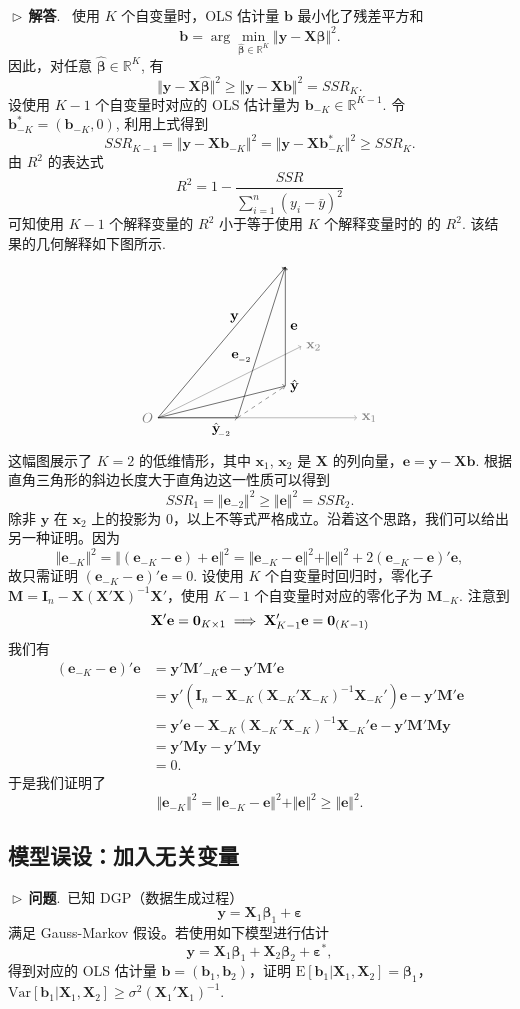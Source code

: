 \documentclass{article}
\newcommand{\E}{\mathrm{E}}
\newcommand{\Var}{\mathrm{Var}}
\newcommand{\y}{\mathbf{y}}
\newcommand{\X}{\mathbf{X}}
\newcommand{\M}{\mathbf{M}}
\newcommand{\e}{\mathbf{e}}
\newcommand{\0}{\mathbf{0}}
\newcommand{\vbe}{\bm{\beta}}
\newcommand{\ve}{\bm{\varepsilon}}
\newcommand{\vb}{\mathbf{b}}
\newcommand{\pro}{\noindent$\vartriangleright\,$\textbf{问题}.\ }
\newcommand{\sol}{\noindent$\vartriangleright\,$\textbf{解答}.\ }
\begin{document}
\sol
使用 $K$ 个自变量时，OLS 估计量 $\vb$ 最小化了残差平方和
\[
\vb=\arg\min_{\hat{\vbe}\in\mathbb{R}^K}\Vert\y-\X\hat{\vbe}\Vert^2.
\]
因此，对任意 $\hat{\vbe}\in\mathbb{R}^K$, 有
\[
\Vert\y-\X\hat{\vbe}\Vert^2\ge\Vert\y-\X\vb\Vert^2=SSR_K.
\]
设使用 $K-1$ 个自变量时对应的 OLS 估计量为 $\vb_{-K}\in\mathbb{R}^{K-1}$. 令 $\vb_{-K}^*=(\vb_{-K},0)$, 利用上式得到
\[
SSR_{K-1}=\Vert\y-\X\vb_{-K}\Vert^2=\Vert\y-\X\vb_{-K}^*\Vert^2\ge SSR_K.
\]
由 $R^2$ 的表达式
\[
R^2=1-\frac{SSR}{\sum\limits_{i=1}^n(y_i-\bar{y})^2}
\]    
可知使用 $K-1$ 个解释变量的 $R^2$ 小于等于使用 $K$ 个解释变量时的 的 $R^2$. 该结果的几何解释如下图所示.
\[
\begin{tikzpicture}
\draw [color=black!50,->](0,0) node[left]{$O$}-- node [color=black!20,pos=0.25,above,sloped]{}(3.6,1.8) node[right]{$\mathbf{x}_2$};
\draw [color=black!50,->](0,0) node[left]{}-- node [color=black!20,pos=0.25,above,sloped]{}(5,0) node[right]{$\mathbf{x}_1$};
\draw [color=black,->](0,0) node[left]{}-- node [color=black,pos=0.6,above]{$\y$}(3.2,3.8) node[right]{};
\draw [color=black,->](3.2,0.8) node[left]{}-- node [color=black,pos=0.5,right]{$\e$}(3.2,3.8) node[right]{};
\draw [color=black,->](0,0) node[left]{}-- node [color=red!70,pos=0.25,above,sloped]{}(3.2,0.8) node[right]{$\hat{\y}$};
\draw [color=black,->](2,0) node[left]{}-- node [color=black,pos=0.4,left]{$\e_{\hspace{-0.5pt}_{-2}}$}(3.2,3.8) node[right]{};
\draw [color=black,->](0,0) node[left]{}-- node [color=black,pos=0.8,below]{$\hat{\y}_{\hspace{-2pt}_{-2}}$}(2,0) node[right]{};
\draw [color=black!70,-,dashed](2,0) node[left]{}-- node [color=red!70,pos=0.25,above,sloped]{}(3.2,0.8) node[right]{};
\end{tikzpicture}
\]
这幅图展示了 $K=2$ 的低维情形，其中 $\mathbf{x}_1$, $\mathbf{x}_2$ 是 $\X$ 的列向量，$\e=\y-\X\vb$. 根据直角三角形的斜边长度大于直角边这一性质可以得到
\[
SSR_{1}=\Vert\e_{-2}\Vert^2\ge\Vert\e\Vert^2= SSR_2.
\] 
除非 $\y$ 在 $\mathbf{x}_2$ 上的投影为 0，以上不等式严格成立。沿着这个思路，我们可以给出另一种证明。因为
\[
\Vert\e_{-K}\Vert^2=\Vert(\e_{-K}-\e)+\e\Vert^2=\Vert\e_{-K}-\e\Vert^2+\Vert\e\Vert^2+2(\e_{-K}-\e)'\e,
\]
故只需证明 $(\e_{-K}-\e)'\e=0$. 设使用 $K$ 个自变量时回归时，零化子 $\M=\mathbf{I}_n-\X(\X'\X)^{-1}\X'$，使用 $K-1$ 个自变量时对应的零化子为 $\M_{-K}$. 注意到
\[
\X'\e=\0_{K\times 1}\implies\X'_{K-1}\e=\0_{(K-1)\time 1}
\]
我们有
\begin{align*}
(\e_{-K}-\e)'\e&=\y'\M'_{-K}\e-\y'\M'\e\\
&=\y'(\mathbf{I}_{n}-\X_{-K}(\X_{-K}'\X_{-K})^{-1}\X_{-K}')\e-\y'\M'\e\\
&=\y'\e-\X_{-K}(\X_{-K}'\X_{-K})^{-1}\X_{-K}'\e-\y'\M'\M\y\\
&=\y'\M\y-\y'\M\y\\
&=0.
\end{align*}
于是我们证明了
\[
\Vert\e_{-K}\Vert^2=\Vert\e_{-K}-\e\Vert^2+\Vert\e\Vert^2\ge\Vert\e\Vert^2.
\]

\subsection{模型误设：加入无关变量}
\pro 已知 DGP（数据生成过程）
\[
\y = \X_1 \vbe_1 +\ve
\]
满足 Gauss-Markov 假设。若使用如下模型进行估计
\[
\y = \X_1 \vbe_1 +\X_2 \vbe_2+\ve^*,
\]
得到对应的 OLS 估计量 $\vb=(\vb_1,\vb_2)$，证明 $\E[\vb_1|\X_1,\X_2]=\vbe_1$，$\Var[\vb_1|\X_1,\X_2]\ge\sigma^2(\X_1'\X_1)^{-1}$.
\end{document}
